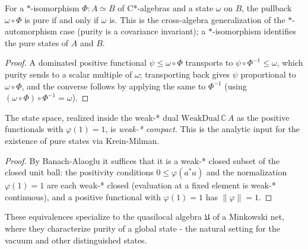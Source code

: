 \begin{theorem}
    \label{thrm:pure-pullback-invariant}
    \leanok
    For a $*$-isomorphism $\Phi : A \simeq B$ of C*-algebras and a state $\omega$ on $B$, the pullback $\omega \circ \Phi$ is pure if and only if $\omega$ is. This is the cross-algebra generalization of the $*$-automorphism case (purity is a covariance invariant); a $*$-isomorphism identifies the pure states of $A$ and $B$.
\end{theorem}
\begin{proof}
    \leanok
    A dominated positive functional $\psi \le \omega \circ \Phi$ transports to $\psi \circ \Phi^{-1} \le \omega$, which purity sends to a scalar multiple of $\omega$; transporting back gives $\psi$ proportional to $\omega \circ \Phi$, and the converse follows by applying the same to $\Phi^{-1}$ (using $(\omega \circ \Phi)\circ \Phi^{-1} = \omega$).
\end{proof}

\begin{theorem}
    \label{thrm:state-space-weak-compact}
    \leanok
    The state space, realized inside the weak-* dual $\mathrm{WeakDual}\,\mathbb{C}\,A$ as the positive functionals with $\varphi(1) = 1$, is \emph{weak-* compact}. This is the analytic input for the existence of pure states via Krein-Milman.
\end{theorem}
\begin{proof}
    \leanok
    By Banach-Alaoglu it suffices that it is a weak-* closed subset of the closed unit ball: the positivity conditions $0 \le \varphi(a^* a)$ and the normalization $\varphi(1) = 1$ are each weak-* closed (evaluation at a fixed element is weak-* continuous), and a positive functional with $\varphi(1)=1$ has $\|\varphi\| = 1$.
\end{proof}

These equivalences specialize to the quasilocal algebra $\mathfrak{U}$ of a Minkowski net, where they characterize purity of a global state - the natural setting for the vacuum and other distinguished states.

